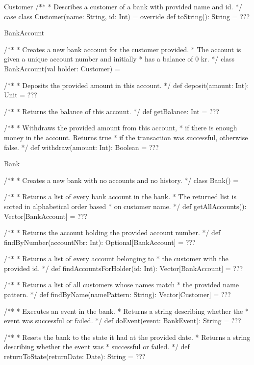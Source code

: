 \begin{ScalaSpec}{Customer}
/**
 * Describes a customer of a bank with provided name and id.
 */
case class Customer(name: String, id: Int) = {
	override def toString(): String = ???
}

\end{ScalaSpec}


\begin{ScalaSpec}{BankAccount}

/**
 * Creates a new bank account for the customer provided.
 * The account is given a unique account number and initially
 * has a balance of 0 kr.
 */
class BankAccount(val holder: Customer) = {

  /**
   * Deposits the provided amount in this account.
   */
  def deposit(amount: Int): Unit = ???

  /**
   * Returns the balance of this account.
   */
  def getBalance: Int = ???

  /**
   * Withdraws the provided amount from this account,
   * if there is enough money in the account. Returns true
   * if the transaction was successful, otherwise false.
   */
  def withdraw(amount: Int): Boolean = ???

}
\end{ScalaSpec}


\begin{ScalaSpec}{Bank}

/**
 * Creates a new bank with no accounts and no history.
 */
class Bank() = {

 /**
   * Returns a list of every bank account in the bank.
   * The returned list is sorted in alphabetical order based
   * on customer name.
   */
  def getAllAccounts(): Vector[BankAccount] = ???

  /**
   * Returns the account holding the provided account number.
   */
  def findByNumber(accountNbr: Int): Optional[BankAccount] = ???

  /**
   * Returns a list of every account belonging to
   * the customer with the provided id.
   */
  def findAccountsForHolder(id: Int): Vector[BankAccount] = ???

  /**
   * Returns a list of all customers whose names match
   * the provided name pattern.
   */
  def findByName(namePattern: String): Vector[Customer] = ???

 /**
   * Executes an event in the bank.
   * Returns a string describing whether the
   * event was successful or failed.
   */
  def doEvent(event: BankEvent): String = ???

  /**
   * Resets the bank to the state it had at the provided date.
   * Returns a string describing whether the event was
   * successful or failed.
   */
  def returnToState(returnDate: Date): String = ???

}
\end{ScalaSpec}


